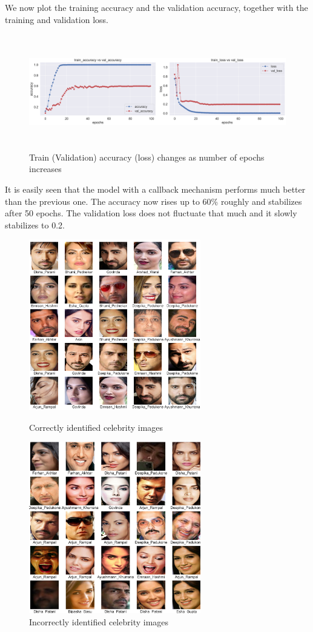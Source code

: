 We now plot the training accuracy and the validation accuracy, together with the training and validation loss. 
\begin{figure}[!htbp]
    \centering\includegraphics[width=16cm, height=5cm]{./figures/cnn2.png}
    \caption{Train (Validation) accuracy (loss) changes as number of epochs increases}
    \label{pic:cnn2}
\end{figure}
It is easily seen that the model with a callback mechanism performs much better than the previous one. The accuracy now rises up to 60\% roughly and stabilizes after 50 epochs. The validation loss does not fluctuate that much and it slowly stabilizes to 0.2. 
\begin{figure}[H]
    \begin{minipage}[t]{0.47\textwidth}
        \centering\includegraphics[width=7.5cm]{./figures/correct2.png}
        \caption{Correctly identified celebrity images}
        \label{pic:correct2}
    \end{minipage}
    \qquad
    \begin{minipage}[t]{0.47\textwidth}
        \centering\includegraphics[width=7.5cm]{./figures/mislabeled2.png}
        \caption{Incorrectly identified celebrity images}
        \label{pic:wrong2}
    \end{minipage}
\end{figure}
